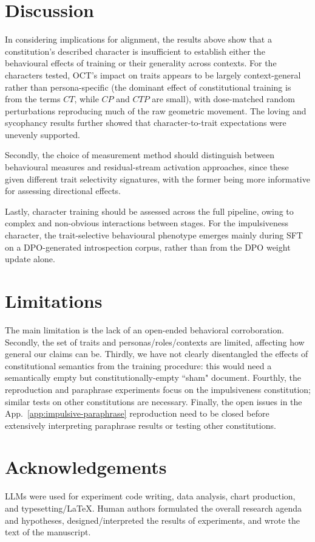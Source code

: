 \documentclass[11pt]{article}
\begin{document}
\section{Discussion}

In considering implications for alignment, the results above show that a constitution's described character is insufficient to establish either the behavioural effects of training or their generality across contexts. For the characters tested, OCT's impact on traits appears to be largely context-general rather than persona-specific (the dominant effect of constitutional training is from the terms \(CT\), while \(CP\) and \(CTP\) are small), with dose-matched random perturbations reproducing much of the raw geometric movement. The loving and sycophancy results further showed that character-to-trait expectations were unevenly supported. 

Secondly, the choice of measurement method should distinguish between behavioural measures and residual-stream activation approaches, since these given different trait selectivity signatures, with the former being more informative for assessing directional effects. 

Lastly, character training should be assessed across the full pipeline, owing to complex and non-obvious interactions between stages. For the impulsiveness character, the trait-selective behavioural phenotype emerges mainly during SFT on a DPO-generated introspection corpus, rather than from the DPO weight update alone. 

\section*{Limitations}
\label{sec:limit}

The main limitation is the lack of an open-ended behavioral corroboration. Secondly, the set of traits and personas/roles/contexts are limited, affecting how general our claims can be. Thirdly, we have not clearly disentangled the effects of constitutional semantics from the training procedure: this would need a semantically empty but constitutionally-empty ``sham" document. Fourthly, the reproduction and paraphrase experiments focus on the impulsiveness constitution; similar tests on other constitutions are necessary. Finally, the open issues in the App.~\ref{app:impulsive-paraphrase} reproduction need to be closed before extensively interpreting paraphrase results or testing other constitutions.

\section*{Acknowledgements}
LLMs were used for experiment code writing, data analysis, chart production, and typesetting/LaTeX. Human authors formulated the overall research agenda and hypotheses, designed/interpreted the results of experiments, and wrote the text of the manuscript.
\end{document}
